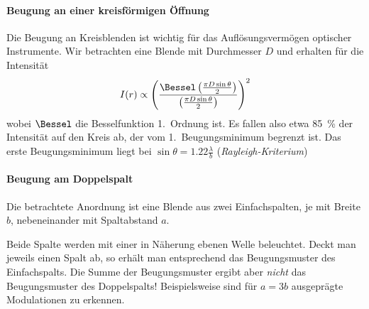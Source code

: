 \paragraph{Beugung an einer kreisförmigen Öffnung}%
Die Beugung an Kreisblenden ist wichtig für das
Auflösungsvermögen optischer Instrumente.
Wir betrachten eine Blende mit Durchmesser
$D$ und erhalten für die
Intensität
\begin{gather*}
  I(r) \propto \left(
    \frac
    { \Bessel \left(\frac{\pi D\sin\theta}{2}\right) }
    { \left(\frac{\pi D\sin\theta}{2}\right) }
    \right)^2
\end{gather*}
wobei $\Bessel$ die Besselfunktion 1.~Ordnung ist.
Es fallen also etwa \SI{85}{\percent} der Intensität auf den Kreis ab,
der vom 1.~Beugungsminimum begrenzt ist. Das erste Beugungsminimum
liegt bei $\sin\theta = \num{1,22}\frac{\lambda}{b}$ 
(\emph{Rayleigh-Kriterium})

\paragraph{Beugung am Doppelspalt}%
Die betrachtete Anordnung ist eine Blende aus zwei Einfachspalten, je mit
Breite $b$, nebeneinander mit Spaltabstand
$a$.

Beide Spalte werden mit einer in Näherung ebenen Welle
beleuchtet. Deckt man jeweils einen Spalt ab, so erhält man entsprechend das
Beugungsmuster des Einfachspalts. Die Summe der Beugungsmuster ergibt
aber \emph{nicht} das Beugungsmuster des Doppelspalts!
Beispielsweise sind für $a=3b$ ausgeprägte Modulationen zu erkennen.


